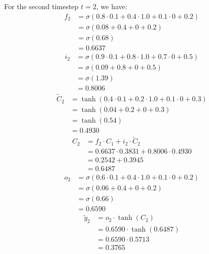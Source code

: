 For the second timestep \( t = 2 \), we have:
\begin{align}
    f_2 &= \sigma(0.8 \cdot 0.1 + 0.4 \cdot 1.0 + 0.1 \cdot 0 + 0.2) \nonumber \\
        &= \sigma(0.08 + 0.4 + 0 + 0.2) \nonumber \\
        &= \sigma(0.68) \nonumber \\
        &= 0.6637
\end{align}
\begin{align}
    i_2 &= \sigma(0.9 \cdot 0.1 + 0.8 \cdot 1.0 + 0.7 \cdot 0 + 0.5) \nonumber \\
        &= \sigma(0.09 + 0.8 + 0 + 0.5) \nonumber \\
        &= \sigma(1.39) \nonumber \\
        &= 0.8006
\end{align}
\begin{align}
    \tilde{C}_2 &= \tanh(0.4 \cdot 0.1 + 0.2 \cdot 1.0 + 0.1 \cdot 0 + 0.3) \nonumber \\
                &= \tanh(0.04 + 0.2 + 0 + 0.3) \nonumber \\
                &= \tanh(0.54) \nonumber \\
                &= 0.4930
\end{align}
\begin{align}
    C_2 &= f_2 \cdot C_1 + i_2 \cdot \tilde{C}_2 \nonumber \\
        &= 0.6637 \cdot 0.3831 + 0.8006 \cdot 0.4930 \nonumber \\
        &= 0.2542 + 0.3945 \nonumber \\
        &= 0.6487
\end{align}
\begin{align}
    o_2 &= \sigma(0.6 \cdot 0.1 + 0.4 \cdot 1.0 + 0.1 \cdot 0 + 0.2) \nonumber \\
        &= \sigma(0.06 + 0.4 + 0 + 0.2) \nonumber \\
        &= \sigma(0.66) \nonumber \\
        &= 0.6590
\end{align}
\begin{align}
    \tilde{y}_2 &= o_2 \cdot \tanh(C_2) \nonumber \\
                &= 0.6590 \cdot \tanh(0.6487) \nonumber \\
                &= 0.6590 \cdot 0.5713 \nonumber \\
                &= 0.3765
\end{align}


